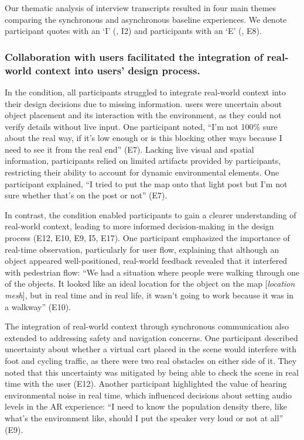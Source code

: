 Our thematic analysis of interview transcripts resulted in four main themes comparing the synchronous \SystemName and asynchronous baseline experiences. We denote \insitu participant quotes with an `I' (\eg, I2) and \exsitu participants with an `E' (\eg, E8).

\subsubsection{\textbf{Collaboration with \insitu users facilitated the integration of real-world context into \exsitu users' design process.}}\label{sec:results:interviews:real-world_context}
In the \async condition, all \exsitu participants struggled to integrate real-world context into their design decisions due to missing information.
\Exsitu users were uncertain about object placement and its interaction with the environment, as they could not verify details without live input. One participant noted, ``I'm not 100\% sure about the real way, if it's low enough or is this blocking other ways because I need to see it from the real end'' (E7). Lacking live visual and spatial information, \exsitu participants relied on limited artifacts provided by \insitu participants, restricting their ability to account for dynamic environmental elements. One participant explained, ``I tried to put the map onto that light post but I'm not sure whether that's on the post or not'' (E7).

In contrast, the \sync condition enabled participants to gain a clearer understanding of real-world context, leading to more informed decision-making in the design process (E12, E10, E9, I5, E17). One \exsitu participant emphasized the importance of real-time observation, particularly for user flow, explaining that although an object appeared well-positioned, real-world feedback revealed that it interfered with pedestrian flow: ``We had a situation where people were walking through one of the objects. It looked like an ideal location for the object on the map [\textit{location mesh}], but in real time and in real life, it wasn't going to work because it was in a walkway'' (E10).

The integration of real-world context through synchronous communication also extended to addressing safety and navigation concerns. One \exsitu participant described uncertainty about whether a virtual cart placed in the scene would interfere with foot and cycling traffic, as there were two real obstacles on either side of it. They noted that this uncertainty was mitigated by being able to check the scene in real time with the \insitu user (E12). Another participant highlighted the value of hearing environmental noise in real time, which influenced decisions about setting audio levels in the AR experience: ``I need to know the population density there, like what's the environment like, should I put the speaker very loud or not at all'' (E9).

